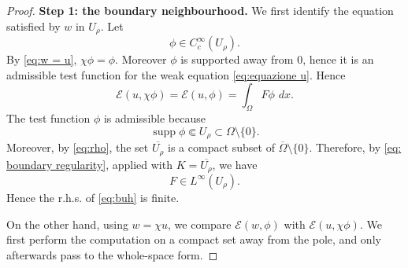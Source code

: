 \documentclass[11pt,a4paper]{article}
\newcommand{\dd}{\,d}
\newcommand{\supp}{\operatorname{supp}}
\begin{document}
\begin{proof}
\medskip
\noindent\textbf{Step 1: the boundary neighbourhood.}
We first identify the equation satisfied by \(w\) in \(U_\rho\). Let
\[
\phi\in C_c^\infty(U_\rho).
\]
By \eqref{eq:w = u}, \(\chi\phi=\phi\). Moreover \(\phi\) is supported away from \(0\), hence it is an admissible test function for the weak equation \eqref{eq:equazione u}.
Hence
\begin{equation}\label{eq:buh}
\mathcal E(u,\chi\phi)
=
\mathcal E(u,\phi)
=
\int_\Omega F\phi\,\dd x.
\end{equation}
The test function \(\phi\) is admissible because
\[
\supp\phi\Subset U_\rho\subset\Omega\setminus\{0\}.
\]
Moreover, by \eqref{eq:rho}, the set \(\overline{U_\rho}\) is a
compact subset of \(\overline\Omega\setminus\{0\}\). Therefore, by
\eqref{eq: boundary regularity}, applied with \(K=\overline{U_\rho}\), we have
\begin{equation}\label{eq:F limitata}
F\in L^\infty(U_\rho).
\end{equation}
Hence the r.h.s. of \eqref{eq:buh} is finite.

On the other hand, using \(w=\chi u\), we compare
\(\mathcal E(w,\phi)\) with \(\mathcal E(u,\chi\phi)\). We first perform the
computation on a compact set away from the pole, and only afterwards pass to
the whole-space form.


\end{proof}
\end{document}
